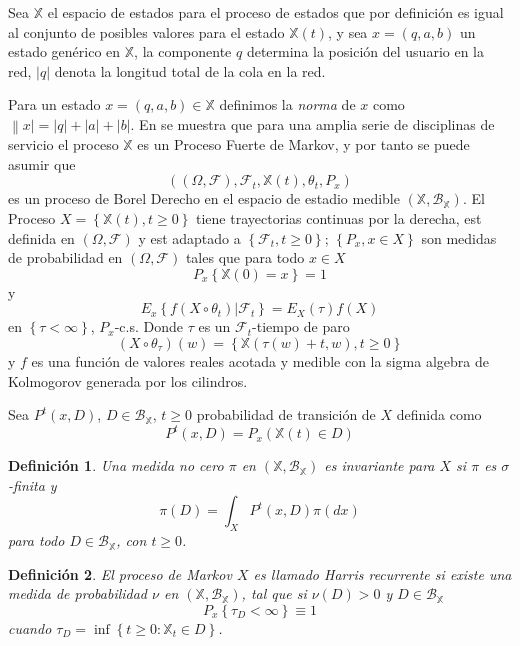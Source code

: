 \documentclass{article}
\newtheorem{Def}{Definición}[section]
\numberwithin{equation}{section}
\begin{document}
Sea $\mathbb{X}$ el espacio de estados para el proceso de estados
que por definici\'on es igual  al conjunto de posibles valores
para el estado $\mathbb{X}\left(t\right)$, y sea
$x=\left(q,a,b\right)$ un estado gen\'erico en $\mathbb{X}$, la
componente $q$ determina la posici\'on del usuario en la red,
$|q|$ denota la longitud total de la cola en la red.

Para un estado $x=\left(q,a,b\right)\in\mathbb{X}$ definimos la
{\em norma} de $x$ como $\left\|x\right|=|q|+|a|+|b|$. En
\cite{Dai} se muestra que para una amplia serie de disciplinas de
servicio el proceso $\mathbb{X}$ es un Proceso Fuerte de Markov, y
por tanto se puede asumir que
\[\left(\left(\Omega,\mathcal{F}\right),\mathcal{F}_{t},\mathbb{X}\left(t\right),\theta_{t},P_{x}\right)\]
es un proceso de Borel Derecho en el espacio de estadio medible
$\left(\mathbb{X},\mathcal{B}_{\mathbb{X}}\right)$. El Proceso
$X=\left\{\mathbb{X}\left(t\right),t\geq0\right\}$ tiene
trayectorias continuas por la derecha, est definida en
$\left(\Omega,\mathcal{F}\right)$ y est adaptado a
$\left\{\mathcal{F}_{t},t\geq0\right\}$; $\left\{P_{x},x\in
X\right\}$ son medidas de probabilidad en
$\left(\Omega,\mathcal{F}\right)$ tales que para todo $x\in X$
\[P_{x}\left\{\mathbb{X}\left(0\right)=x\right\}=1\] y
\[E_{x}\left\{f\left(X\circ\theta_{t}\right)|\mathcal{F}_{t}\right\}=E_{X}\left(\tau\right)f\left(X\right)\]
en $\left\{\tau<\infty\right\}$, $P_{x}$-c.s. Donde $\tau$ es un
$\mathcal{F}_{t}$-tiempo de paro
\[\left(X\circ\theta_{\tau}\right)\left(w\right)=\left\{\mathbb{X}\left(\tau\left(w\right)+t,w\right),t\geq0\right\}\]
y $f$ es una funci\'on de valores reales acotada y medible con la
sigma algebra de Kolmogorov generada por los cilindros.

Sea $P^{t}\left(x,D\right)$, $D\in\mathcal{B}_{\mathbb{X}}$,
$t\geq0$ probabilidad de transici\'on de $X$ definida como
\[P^{t}\left(x,D\right)=P_{x}\left(\mathbb{X}\left(t\right)\in
D\right)\]

\begin{Def}
Una medida no cero $\pi$ en
$\left(\mathbb{X},\mathcal{B}_{\mathbb{X}}\right)$ es {\em
invariante} para $X$ si $\pi$ es $\sigma$-finita y
\[\pi\left(D\right)=\int_{X}P^{t}\left(x,D\right)\pi\left(dx\right)\]
para todo $D\in \mathcal{B}_{\mathbb{X}}$, con $t\geq0$.
\end{Def}

\begin{Def}
El proceso de Markov $X$ es llamado {\em Harris recurrente} si
existe una medida de probabilidad $\nu$ en
$\left(\mathbb{X},\mathcal{B}_{\mathbb{X}}\right)$, tal que si
$\nu\left(D\right)>0$ y $D\in\mathcal{B}_{\mathbb{X}}$
\[P_{x}\left\{\tau_{D}<\infty\right\}\equiv1\] cuando
$\tau_{D}=\inf\left\{t\geq0:\mathbb{X}_{t}\in D\right\}$.
\end{Def}
\end{document}
